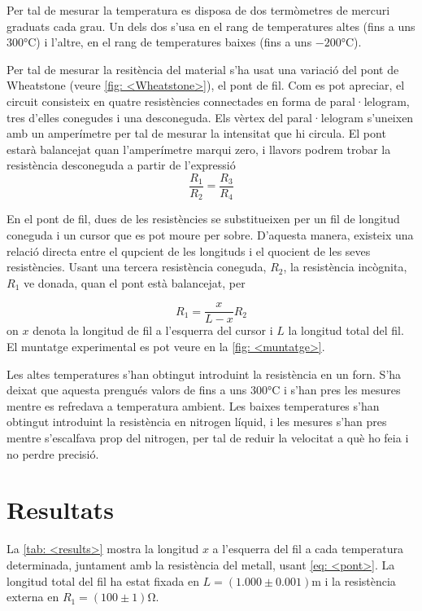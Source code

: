 Per tal de mesurar la temperatura es disposa de dos termòmetres de mercuri graduats cada grau. Un dels dos s'usa en el rang de temperatures altes (fins a uns $300\si{\celsius}$) i l'altre, en el rang de temperatures baixes (fins a uns $-200 \si{\celsius}$).

Per tal de mesurar la resitència del material s'ha usat una variació del pont de Wheatstone (veure \ref{fig: <Wheatstone>}), el pont de fil. Com es pot apreciar, el circuit consisteix en quatre resistències connectades en forma de paral·lelogram, tres d'elles conegudes i una desconeguda. Els vèrtex del paral·lelogram s'uneixen amb un amperímetre per tal de mesurar la intensitat que hi circula. El pont estarà balancejat quan l'amperímetre marqui zero, i llavors podrem trobar la resistència desconeguda a partir de l'expressió
\begin{equation}
\frac{R_1}{R_2}=\frac{R_3}{R_4}
\end{equation} 

En el pont de fil, dues de les resistències se substitueixen per un fil de longitud coneguda i un cursor que es pot moure per sobre. D'aquesta manera, existeix una relació directa entre el qupcient de les longituds i el quocient de les seves resistències. Usant una tercera resistència coneguda, $R_2$, la resistència incògnita, $R_1$ ve donada, quan el pont està balancejat, per

\begin{equation}\label{eq: <pont>}
R_1=\frac{x}{L-x}R_2
\end{equation}
on $x$ denota la longitud de fil a l'esquerra del cursor i $L$ la longitud total del fil. El muntatge experimental es pot veure en la \ref{fig: <muntatge>}. 

Les altes temperatures s'han obtingut introduint la resistència en un forn. S'ha deixat que aquesta prengués valors de fins a uns $300\si{\celsius}$ i s'han pres les mesures mentre es refredava a temperatura ambient. Les baixes temperatures s'han obtingut introduint la resistència en nitrogen líquid, i les mesures s'han pres mentre s'escalfava prop del nitrogen, per tal de reduir la velocitat a què ho feia i no perdre precisió.


\section{Resultats}

La \ref{tab: <results>} mostra la longitud $x$ a l'esquerra del fil a cada temperatura determinada, juntament amb la resistència del metall, usant \ref{eq: <pont>}. La longitud total del fil ha estat fixada en $L=(1.000\pm0.001)\si{\meter}$ i la resistència externa en $R_1=(100\pm1)\si{\ohm}$.

